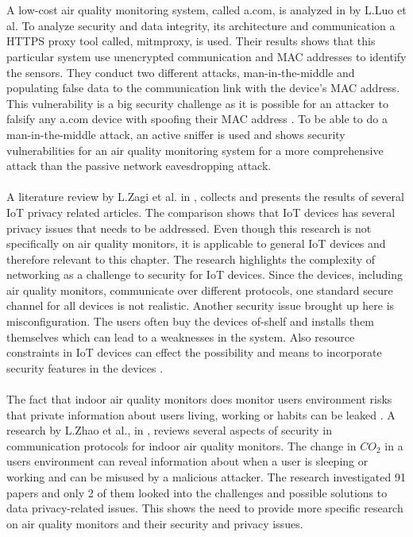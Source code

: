 \\\\
A low-cost air quality monitoring system, called a.com, is analyzed in \cite{SecurityAndDataIntInAQM} by L.Luo et al. To analyze security and data integrity, its architecture and communication a HTTPS proxy tool called, mitmproxy, is used. Their results shows that this particular system use unencrypted communication and MAC addresses to identify the sensors. They conduct two different attacks, man-in-the-middle and populating false data to the communication link with the device's MAC address. This vulnerability is a big security challenge as it is possible for an attacker to falsify any a.com device with spoofing their MAC address \cite{SecurityAndDataIntInAQM}. To be able to do a man-in-the-middle attack, an active sniffer is used and shows security vulnerabilities for an air quality monitoring system for a more comprehensive attack than the passive network eavesdropping attack. 
\\\\
A literature review by L.Zagi et al. in \cite{PrivacyOnGeneralIoT}, collects and presents the results of several IoT privacy related articles. The comparison shows that IoT devices has several privacy issues that needs to be addressed. Even though this research is not specifically on air quality monitors, it is applicable to general IoT devices and therefore relevant to this chapter. The research highlights the complexity of networking as a challenge to security for IoT devices. Since the devices, including air quality monitors, communicate over different protocols, one standard secure channel for all devices is not realistic. Another security issue brought up here is misconfiguration. The users often buy the devices of-shelf and installs them themselves which can lead to a weaknesses in the system. Also resource constraints in IoT devices can effect the possibility and means to incorporate security features in the devices \cite{PrivacyOnGeneralIoT}. 
\\\\
The fact that indoor air quality monitors does monitor users environment risks that private information about users living, working or habits can be leaked \cite{IAQMonitorCommunicationReview}. A research by L.Zhao et al., in \cite{IAQMonitorCommunicationReview}, reviews several aspects of security in communication protocols for indoor air quality monitors. The change in \(CO_2\) in a users environment can reveal information about when a user is sleeping or working and can be misused by a malicious attacker. The research investigated 91 papers and only 2 of them looked into the challenges and possible solutions to data privacy-related issues. This shows the need to provide more specific research on air quality monitors and their security and privacy issues. 
